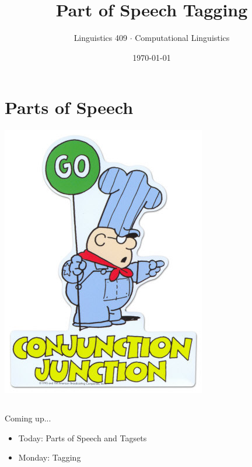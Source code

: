 \documentclass[9pt,xcolor=pdftex,dvipsnames,table]{beamer}
\title{Part of Speech Tagging}
\subtitle{}
\author{Linguistics 409 $\cdot$ Computational Linguistics}
\institute{Rice University}
\date[]{{\small \today}}
\begin{document}

\section{Parts of Speech}

\begin{frame}

	\titlepage
	\begin{center}
		\includegraphics[width=.2\paperwidth]{conjunction-junction.jpg}	
	\end{center}
\end{frame}

\subsection{}
\begin{frame}{Coming up...}

	\begin{itemize}
		\item Today: Parts of Speech and Tagsets
		\item Monday: Tagging
	\end{itemize}
\end{frame}
\end{document}
